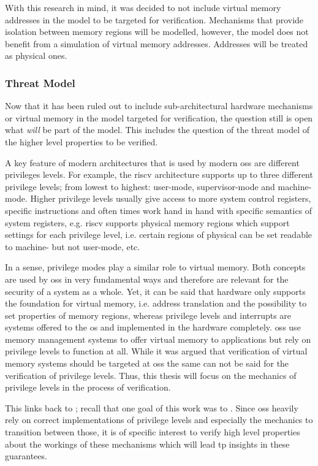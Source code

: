 With this research in mind, it was decided to not include virtual memory addresses in the model to be targeted for verification.
Mechanisms that provide isolation between memory regions will be modelled, however, the model does not benefit from a simulation of virtual memory addresses.
Addresses will be treated as physical ones.

\subsubsection{Threat Model}

Now that it has been ruled out to include sub-architectural hardware mechanisms or virtual memory in the model targeted for verification, the question still is open what \textit{will} be part of the model.
This includes the question of the threat model of the higher level properties to be verified.

A key feature of modern architectures that is used by modern \glspl{os} are different privileges levels.
For example, the \gls{riscv} architecture supports up to three different privilege levels; from lowest to highest: user-mode, supervisor-mode and machine-mode.
Higher privilege levels usually give access to more system control registers, specific instructions and often times work hand in hand with specific semantics of system registers, e.g. \gls{riscv} supports physical memory regions which support settings for each privilege level, i.e. certain regions of physical can be set readable to machine- but not user-mode, etc.

In a sense, privilege modes play a similar role to virtual memory.
Both concepts are used by \glspl{os} in very fundamental ways and therefore are relevant for the security of a system as a whole.
Yet, it can be said that hardware only supports the foundation for virtual memory, i.e. address translation and the possibility to set properties of memory regions, whereas privilege levels and interrupts are systems offered to the \gls{os} and implemented in the hardware completely.
\glspl{os} use memory management systems to offer virtual memory to applications but rely on privilege levels to function at all.
While it was argued that verification of virtual memory systems should be targeted at \glspl{os} the same can not be said for the verification of privilege levels.
Thus, this thesis will focus on the mechanics of privilege levels in the process of verification.

This links back to \cite{Reid17}; recall that one goal of this work was to .
Since \glspl{os} heavily rely on correct implementations of privilege levels and especially the mechanics to transition between those, it is of specific interest to verify high level properties about the workings of these mechanisms which will lead tp insights in these guarantees.

